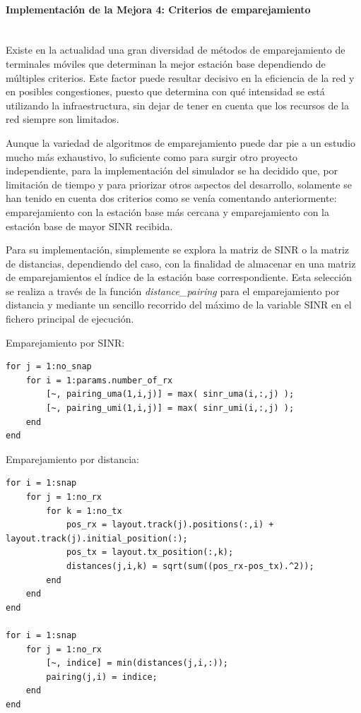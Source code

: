 \paragraph{Implementación de la Mejora 4: Criterios de emparejamiento} \mbox{} \\

Existe en la actualidad una gran diversidad de métodos de emparejamiento de terminales móviles que determinan la mejor estación base dependiendo de múltiples criterios. Este factor puede resultar decisivo en la eficiencia de la red y en posibles congestiones, puesto que determina con qué intensidad se está utilizando la infraestructura, sin dejar de tener en cuenta que los recursos de la red siempre son limitados.

Aunque la variedad de algoritmos de emparejamiento puede dar pie a un estudio mucho más exhaustivo, lo suficiente como para surgir otro proyecto independiente, para la implementación del simulador se ha decidido que, por limitación de tiempo y para priorizar otros aspectos del desarrollo, solamente se han tenido en cuenta dos criterios como se venía comentando anteriormente: emparejamiento con la estación base más cercana y emparejamiento con la estación base de mayor SINR recibida.

Para su implementación, simplemente se explora la matriz de SINR o la matriz de distancias, dependiendo del caso, con la finalidad de almacenar en una matriz de emparejamientos el índice de la estación base correspondiente. Esta selección se realiza a través de la función \textit{distance\_pairing} para el emparejamiento por distancia y mediante un sencillo recorrido del máximo de la variable SINR en el fichero principal de ejecución.

Emparejamiento por SINR:

\begin{lstlisting}[style=Matlab-editor, basicstyle=\tiny]
for j = 1:no_snap
    for i = 1:params.number_of_rx
        [~, pairing_uma(1,i,j)] = max( sinr_uma(i,:,j) );
        [~, pairing_umi(1,i,j)] = max( sinr_umi(i,:,j) );
    end
end
\end{lstlisting}

Emparejamiento por distancia:

\begin{lstlisting}[style=Matlab-editor, basicstyle=\tiny]
for i = 1:snap
    for j = 1:no_rx
        for k = 1:no_tx
            pos_rx = layout.track(j).positions(:,i) + layout.track(j).initial_position(:);
            pos_tx = layout.tx_position(:,k);
            distances(j,i,k) = sqrt(sum((pos_rx-pos_tx).^2));
        end
    end
end
    
for i = 1:snap
    for j = 1:no_rx
        [~, indice] = min(distances(j,i,:));
        pairing(j,i) = indice;
    end
end
\end{lstlisting}

